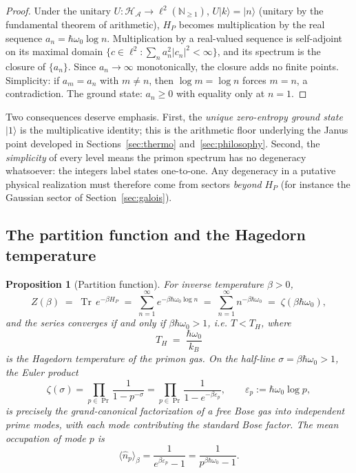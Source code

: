 \documentclass[11pt,a4paper]{article}
\theoremstyle{plain}
\newtheorem{proposition}[theorem]{Proposition}
\theoremstyle{definition}
\theoremstyle{remark}
\newcommand{\ket}[1]{\lvert #1\rangle}
\newcommand{\Nn}{\mathbb{N}}
\newcommand{\Hil}{\mathcal{H}}
\DeclareMathOperator{\Tr}{Tr}
\begin{document}
\begin{proof}
Under the unitary $U\colon\Hil_{\mathcal{A}}\to\ell^{2}(\Nn_{\geq 1})$,
$U\ket{k}=\ket{n}$ (unitary by the fundamental theorem of arithmetic),
$H_{P}$ becomes multiplication by the real sequence
$a_{n}=\hbar\omega_{0}\log n$. Multiplication by a real-valued sequence is self-adjoint on its
maximal domain $\{c\in\ell^{2}:\sum_{n}a_{n}^{2}|c_{n}|^{2}<\infty\}$, and its spectrum is the
closure of $\{a_{n}\}$. Since $a_{n}\to\infty$ monotonically, the closure adds no finite
points. Simplicity: if $a_{m}=a_{n}$ with $m\neq n$, then $\log m=\log n$ forces $m=n$, a
contradiction. The ground state: $a_{n}\geq 0$ with equality only at $n=1$.
\end{proof}

Two consequences deserve emphasis. First, the \emph{unique zero-entropy ground state} $\ket{1}$
is the multiplicative identity; this is the arithmetic floor underlying the Janus point
developed in Sections~\ref{sec:thermo} and~\ref{sec:philosophy}. Second, the \emph{simplicity}
of every level means the primon spectrum has no degeneracy whatsoever: the integers label
states one-to-one. Any degeneracy in a putative physical realization must therefore come from
sectors \emph{beyond} $H_{P}$ (for instance the Gaussian sector of Section~\ref{sec:galois}).

\subsection{The partition function and the Hagedorn temperature}

\begin{proposition}[Partition function]\label{prop:partition}
For inverse temperature $\beta>0$,
\begin{equation}\label{eq:zetaZ}
Z(\beta)\;=\;\Tr\,e^{-\beta H_{P}}
\;=\;\sum_{n=1}^{\infty}e^{-\beta\hbar\omega_{0}\log n}
\;=\;\sum_{n=1}^{\infty}n^{-\beta\hbar\omega_{0}}
\;=\;\zeta(\beta\hbar\omega_{0}),
\end{equation}
and the series converges if and only if $\beta\hbar\omega_{0}>1$, i.e.
$T<T_{H}$, where
\begin{equation}\label{eq:hagedornT}
T_{H}\;=\;\frac{\hbar\omega_{0}}{k_{B}}
\end{equation}
is the \emph{Hagedorn temperature} of the primon gas. On the half-line $\sigma=\beta\hbar\omega_{0}>1$,
the Euler product
\begin{equation}\label{eq:eulerproduct}
\zeta(\sigma)=\prod_{p\in\Pr}\frac{1}{1-p^{-\sigma}}
=\prod_{p\in\Pr}\frac{1}{1-e^{-\beta\varepsilon_{p}}},
\qquad \varepsilon_{p}:=\hbar\omega_{0}\log p,
\end{equation}
is precisely the grand-canonical factorization of a free Bose gas into independent prime modes,
with each mode contributing the standard Bose factor. The mean occupation of mode $p$ is
\begin{equation}
\langle \hat n_{p}\rangle_{\beta}=\frac{1}{e^{\beta\varepsilon_{p}}-1}
=\frac{1}{p^{\beta\hbar\omega_{0}}-1}.
\end{equation}
\end{proposition}
\end{document}
